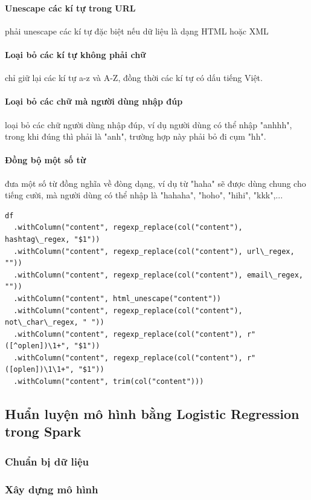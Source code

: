 \documentclass[runningheads]{llncs}
\begin{document}
\paragraph{Unescape các kí tự trong URL} phải unescape các kí tự đặc biệt nếu dữ liệu là dạng HTML hoặc XML
\paragraph{Loại bỏ các kí tự không phải chữ} chỉ giữ lại các kí tự a-z và A-Z, đồng thời các kí tự có dấu tiếng Việt.
\paragraph{Loại bỏ các chữ mà người dùng nhập đúp} loại bỏ các chữ người dùng nhập đúp, ví dụ người dùng có thể nhập "anhhh", trong khi đúng thì phải là "anh", trường hợp này phải bỏ đi cụm "hh".
\paragraph{Đồng bộ một số từ} đưa một số từ đồng nghĩa về đòng dạng, ví dụ từ "haha" sẽ được dùng chung cho tiếng cười, mà người dùng có thể nhập là "hahaha", "hoho", "hihi", "kkk",...

\begin{lstlisting}
df
  .withColumn("content", regexp_replace(col("content"), hashtag\_regex, "$1"))
  .withColumn("content", regexp_replace(col("content"), url\_regex, ""))
  .withColumn("content", regexp_replace(col("content"), email\_regex, ""))
  .withColumn("content", html_unescape("content"))
  .withColumn("content", regexp_replace(col("content"), not\_char\_regex, " "))
  .withColumn("content", regexp_replace(col("content"), r"([^oplen])\1+", "$1"))
  .withColumn("content", regexp_replace(col("content"), r"([oplen])\1\1+", "$1"))
  .withColumn("content", trim(col("content")))
\end{lstlisting}

\subsection{Huẩn luyện mô hình bằng Logistic Regression trong Spark}

\subsubsection{Chuẩn bị dữ liệu}

\subsubsection{Xây dựng mô hình}
\end{document}
